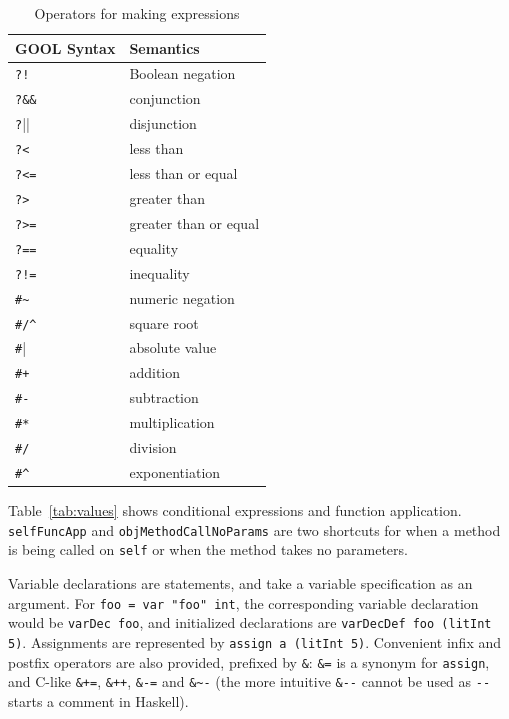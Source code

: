 \documentclass[sigplan,review,anonymous,prologue,dvipsnames]{acmart}
\begin{document}
\begin{table}[htb]
  \caption{Operators for making expressions}
  \begin{tabular}{p{} p{}}
    \textbf{GOOL Syntax} & \textbf{Semantics} \\
    \midrule
    \verb|?!| & Boolean negation \\
    \verb|?&&| & conjunction \\
    \verb|?||| & disjunction \\
    \verb|?<| & less than \\
    \verb|?<=| & less than or equal \\
    \verb|?>| & greater than \\
    \verb|?>=| & greater than or equal \\
    \verb|?==| & equality \\
    \verb|?!=| & inequality \\
    \verb|#~| & numeric negation \\
    \verb|#/^| & square root \\
    \verb|#|| & absolute value \\
    \verb|#+| & addition \\
    \verb|#-| & subtraction \\
    \verb|#*| & multiplication \\
    \verb|#/| & division \\
    \verb|#^| & exponentiation \\
  \end{tabular}
  \label{tab:operators}
\end{table}

Table~\ref{tab:values} shows conditional expressions and function application.
\verb|selfFuncApp| and \verb|objMethodCallNoParams| are two shortcuts for when a
method is being called on \verb|self| or when the method takes no parameters.

Variable declarations are statements, and take a variable specification
as an argument. For \verb|foo = var "foo" int|, the corresponding variable
declaration would be \verb|varDec foo|, and initialized declarations are
\verb|varDecDef foo (litInt 5)|.
Assignments are represented by \verb|assign a (litInt 5)|. Convenient
infix and postfix operators are also provided, prefixed by \verb|&|:
\verb|&=| is a synonym for \verb|assign|, and C-like
\verb|&+=|, \verb|&++|, \verb|&-=| and \verb|&~-| (the more intuitive
\verb|&--| cannot be used as \verb|--| starts a comment in Haskell).
\end{document}
